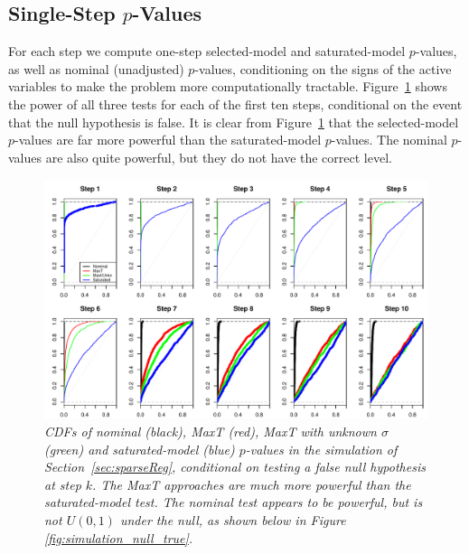 \documentclass{article}
\begin{document}
\subsection{Single-Step $p$-Values}

For each step we compute one-step selected-model and saturated-model $p$-values, as well as nominal (unadjusted) $p$-values, conditioning on the signs of the active variables to make the problem more computationally tractable. Figure~\ref{fig:simulation_null_false} shows the power of all three tests for each of the first ten steps, conditional on the event that the null hypothesis is false. It is clear from Figure~\ref{fig:simulation_null_false} that the selected-model $p$-values are far more powerful than the saturated-model $p$-values. The nominal $p$-values are also quite powerful, but they do not have the correct level.

\begin{figure}[h]
  \centering
  \includegraphics[width=1\textwidth]{figs/simulation_snr_5_alpha_05_null_false.pdf}
  \caption{\em  CDFs of nominal (black), MaxT (red), MaxT with unknown $\sigma$ (green) and  saturated-model (blue) $p$-values in the simulation of Section~\ref{sec:sparseReg}, conditional on testing a false null hypothesis at step $k$. The MaxT approaches are much more powerful than the saturated-model test. The nominal test appears to be powerful, 
  but is not $U(0,1)$ under the null, as shown below in Figure \ref{fig:simulation_null_true}.}
  \label{fig:simulation_null_false}
\end{figure}
\end{document}
